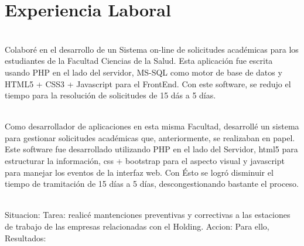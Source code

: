 \documentclass[]{cvStyle1}
\begin{document}
    \section*{Experiencia Laboral}
        {
            \begin{description}[leftmargin=0cm]
                \item [Administrador de Sistemas] \hfill \\
                    Colabor\'e en el desarrollo de un Sistema on-line de 
                    solicitudes acad\'emicas para los estudiantes de la 
                    Facultad Ciencias de la Salud. Esta aplicaci\'on fue 
                    escrita usando PHP en el lado del servidor, MS-SQL 
                    como motor de base de datos y HTML5 + CSS3 + 
                    Javascript para el FrontEnd. Con este software, 
                    se redujo el tiempo para la resoluci\'on de 
                    solicitudes de 15 d\'as a 5 d\'ias.

                \item [Desarrollador de Aplicaciones] \hfill \\
                    Como desarrollador de aplicaciones en esta misma
                    Facultad, desarroll\'e un sistema para gestionar
                    solicitudes acad\'emicas que, anteriormente, se
                    realizaban en papel.
                    Este software fue desarrollado utilizando
                    PHP en el lado del Servidor, html5 para estructurar
                    la informaci\'on, css + bootstrap para el aspecto
                    visual y javascript para manejar los eventos de la
                    interfaz web.
                    Con \'Esto se logr\'o disminuir el tiempo de 
                    tramitaci\'on de 15 d\'ias a 5 d\'ias,
                    descongestionando bastante el proceso.
 
                \item [Soporte Tecnol\'ogico] \hfill \\
                    Situacion:
                    Tarea: realic\'e mantenciones preventivas y
                    correctivas a las estaciones de trabajo de 
                    las empresas relacionadas con el Holding.
                    Accion: Para ello,
                    Resultados:
            \end{description}
        }
                     
\end{document}

